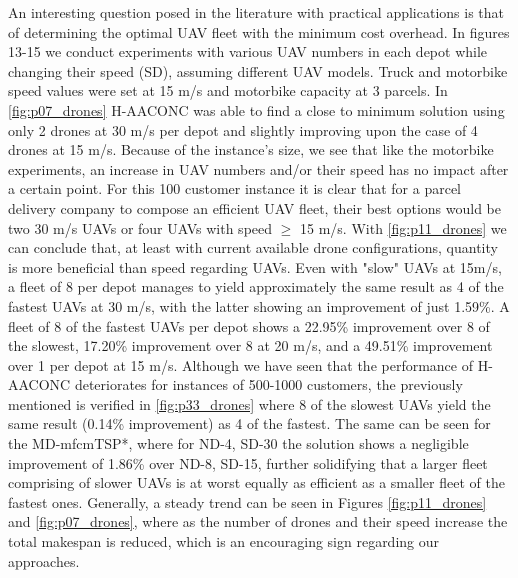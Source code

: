 \documentclass{article}
\begin{document}
	\par 
	An interesting question posed in the literature with practical applications is that of determining the optimal UAV fleet with the minimum cost overhead. In figures 13-15 we conduct experiments with various UAV numbers in each depot while changing their speed (SD), assuming different UAV models. Truck and motorbike speed values were set at 15 m/s and motorbike capacity at 3 parcels. In \autoref{fig:p07_drones} H-AACONC was able to find a close to minimum solution using only 2 drones at 30 m/s per depot and slightly improving upon the case of 4 drones at 15 m/s. Because of the instance's size, we see that like the motorbike experiments, an increase in UAV numbers and/or their speed has no impact after a certain point. For this 100 customer instance it is clear that for a parcel delivery company to compose an efficient UAV fleet, their best options would be two 30 m/s UAVs or four UAVs with speed $\geq$ 15 m/s. With \autoref{fig:p11_drones} we can conclude that, at least with current available drone configurations, quantity is more beneficial than speed regarding UAVs. Even with "slow" UAVs at 15m/s, a fleet of 8 per depot manages to yield approximately the same result as 4 of the fastest UAVs at 30 m/s, with the latter showing an improvement of just 1.59\%. A fleet of 8 of the fastest UAVs per depot shows a 22.95\% improvement over 8 of the slowest, 17.20\% improvement over 8 at 20 m/s, and a 49.51\% improvement over 1 per depot at 15 m/s. 
	Although we have seen that the performance of H-AACONC deteriorates for instances of 500-1000 customers, the previously mentioned is verified in \autoref{fig:p33_drones} where 8 of the slowest UAVs yield the same result (0.14\% improvement) as 4 of the fastest. The same can be seen for the MD-mfcmTSP*, where for ND-4, SD-30 the solution shows a negligible improvement of 1.86\% over ND-8, SD-15, further solidifying that a larger fleet comprising of slower UAVs is at worst equally as  efficient as a smaller fleet of the fastest ones. Generally, a steady trend can be seen in Figures \ref{fig:p11_drones} and \ref{fig:p07_drones}, where as the number of drones and their speed increase the total makespan is reduced, which is an encouraging sign regarding our approaches.
	
\end{document}
